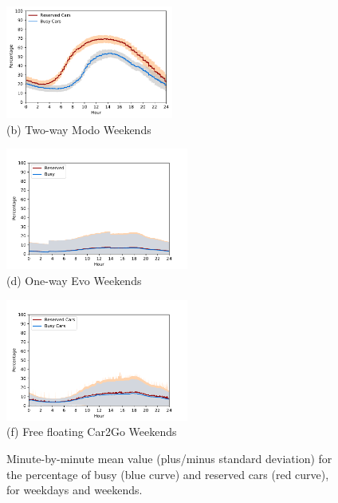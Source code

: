 \begin{figure}
\begin{minipage}[b]{0.45\linewidth}
   \end{minipage}
   \hspace{3mm}
   \begin{minipage}[b]{0.45\linewidth}
   \centering
         \begin{minipage}[b]{\linewidth}
           \centering
           \hspace*{-0.9cm}
           \includegraphics[width=55mm]{modo_inTravel/weekends.pdf}
           {\\(b) Two-way Modo Weekends}
         \end{minipage}
         \begin{minipage}[b]{\linewidth}
           \centering
           \hspace*{-0.6cm}
           \includegraphics[width=60mm]{evo_inTravel/weekendslim.pdf}
           {\\(d) One-way Evo Weekends}
         \end{minipage}
          \begin{minipage}[b]{\linewidth}
           \centering
           \hspace*{-0.6cm}
           \includegraphics[width=60mm]{car2go_inTravel/weekendslim.pdf}
           {\\(f) Free floating Car2Go Weekends}
         \end{minipage}
   \end{minipage}
  \caption{Minute-by-minute mean value (plus/minus standard deviation) for  the  percentage of busy (blue curve) and reserved cars (red curve), for weekdays and weekends.}
   \label{fig:demandPatterns}
\end{figure}

